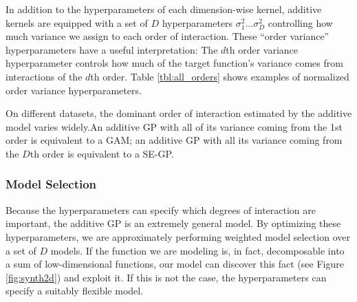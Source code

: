 In addition to the hyperparameters of each dimension-wise kernel, additive kernels are equipped with a set of $D$ hyperparameters $\sigma_1^2 \dots \sigma_D^2$ controlling how much variance we assign to each order of interaction.  These ``order variance'' hyperparameters have a useful interpretation:  The $d$th order variance hyperparameter controls how much of the target function's variance comes from interactions of the $d$th order.
%
%
%
%
Table \ref{tbl:all_orders} shows examples of normalized order variance hyperparameters.


On different datasets, the dominant order of interaction estimated by the additive model varies widely.An additive GP with all of its variance coming from the 1st order is equivalent to a GAM; an additive GP with all its variance coming from the $D$th order is equivalent to a SE-GP.
%
%

\subsubsection{Model Selection}

Because the hyperparameters can specify which degrees of interaction are important, the additive GP is an extremely general model.  By optimizing these hyperparameters, we are approximately performing weighted model selection over a set of $D$ models.  If the function we are modeling is, in fact, decomposable into a sum of low-dimensional functions, our model can discover this fact (see Figure \ref{fig:synth2d}) and exploit it.  If this is not the case, the hyperparameters can specify a suitably flexible model.

